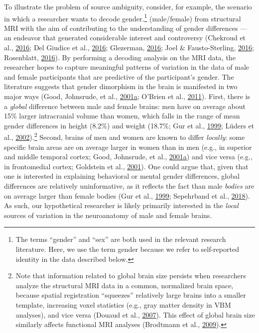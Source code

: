 \documentclass[11pt,american,a4paper,oneside,]{memoir} %
\let\rmarkdownfootnote\footnote%
\def\footnote{\protect\rmarkdownfootnote}
\begin{document}
To illustrate the problem of source ambiguity, consider, for example, the scenario in which a researcher wants to decode gender.\footnote{The terms ``gender'' and ``sex'' are both used in the relevant research literature. Here, we use the term gender because we refer to self-reported identity in the data described below.} (male/female) from structural MRI with the aim of contributing to the understanding of gender differences --- an endeavor that generated considerable interest and controversy (Chekroud et al., \protect\hyperlink{ref-Chekroud2016-tc}{2016}; Del Giudice et al., \protect\hyperlink{ref-Del_Giudice2016-ns}{2016}; Glezerman, \protect\hyperlink{ref-Glezerman2016-xl}{2016}; Joel \& Fausto-Sterling, \protect\hyperlink{ref-Joel2016-uo}{2016}; Rosenblatt, \protect\hyperlink{ref-Rosenblatt2016-oy}{2016}). By performing a decoding analysis on the MRI data, the researcher hopes to capture meaningful patterns of variation in the data of male and female participants that are predictive of the participant's gender. The literature suggests that gender dimorphism in the brain is manifested in two major ways (Good, Johnsrude, et al., \protect\hyperlink{ref-Good2001-ak}{2001}\protect\hyperlink{ref-Good2001-ak}{a}; O'Brien et al., \protect\hyperlink{ref-OBrien2011-lj}{2011}). First, there is a \emph{global} difference between male and female brains: men have on average about 15\% larger intracranial volume than women, which falls in the range of mean gender differences in height (8.2\%) and weight (18.7\%; Gur et al., \protect\hyperlink{ref-Gur1999-qj}{1999}; Lüders et al., \protect\hyperlink{ref-Luders2002-ms}{2002}).\footnote{Note that information related to global brain size persists when researchers analyze the structural MRI data in a common, normalized brain space, because spatial registration ``squeezes'' relatively large brains into a smaller template, increasing voxel statistics (e.g., gray matter density in VBM analyses), and vice versa (Douaud et al., \protect\hyperlink{ref-Douaud2007-sw}{2007}). This effect of global brain size similarly affects functional MRI analyses (Brodtmann et al., \protect\hyperlink{ref-brodtmann2009regional}{2009}).} Second, brains of men and women are known to differ \emph{locally}: some specific brain areas are on average larger in women than in men (e.g., in superior and middle temporal cortex; Good, Johnsrude, et al., \protect\hyperlink{ref-Good2001-ak}{2001}\protect\hyperlink{ref-Good2001-ak}{a}) and vice versa (e.g., in frontomedial cortex; Goldstein et al., \protect\hyperlink{ref-Goldstein2001-dy}{2001}). One could argue that, given that one is interested in explaining behavioral or mental gender differences, global differences are relatively uninformative, as it reflects the fact than male \emph{bodies} are on average larger than female bodies (Gur et al., \protect\hyperlink{ref-Gur1999-qj}{1999}; Sepehrband et al., \protect\hyperlink{ref-Sepehrband2018-dy}{2018}). As such, our hypothetical researcher is likely primarily interested in the \emph{local} sources of variation in the neuroanatomy of male and female brains.
\end{document}
